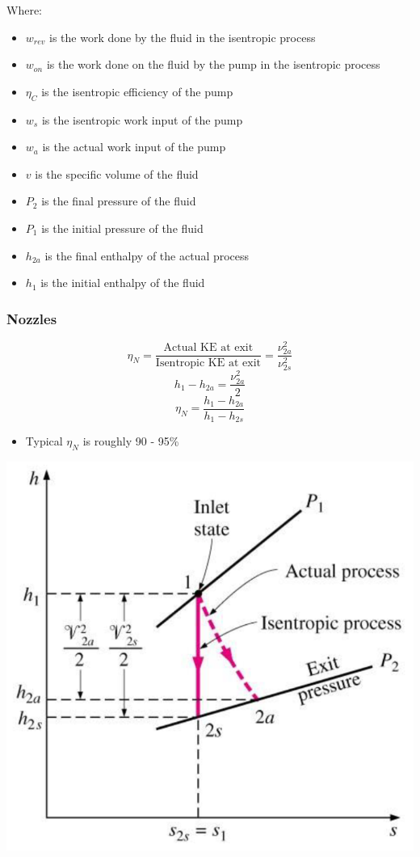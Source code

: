 \documentclass[11pt]{article}
\begin{document}
Where:
\begin{itemize}
\item \(w_{rev}\) is the work done by the fluid in the isentropic process
\item \(w_{on}\) is the work done on the fluid by the pump in the isentropic process
\item \(\eta_C\) is the isentropic efficiency of the pump
\item \(w_s\) is the isentropic work input of the pump
\item \(w_a\) is the actual work input of the pump
\item \(v\) is the specific volume of the fluid
\item \(P_2\) is the final pressure of the fluid
\item \(P_1\) is the initial pressure of the fluid
\item \(h_{2a}\) is the final enthalpy of the actual process
\item \(h_1\) is the initial enthalpy of the fluid
\end{itemize}

 \newpage

\subsubsection{Nozzles}
\label{sec:org9147f63}
\[\eta_N = \frac{\text{Actual KE at exit}}{\text{Isentropic KE at exit}} = \frac{\nu_{2a}^2}{\nu_{2s}^2}\]
\[h_1 - h_{2a} = \frac{\nu_{2a}^2}{2}\]
\[\eta_N = \frac{h_1 - h_{2a}}{h_1 - h_{2s}}\]

\begin{itemize}
\item Typical \(\eta_N\) is roughly 90 - 95\%
\end{itemize}

\begin{center}
\includegraphics[scale=0.8]{./images/isentropic-efficiency-of-nozzles.png}
\end{center}
\end{document}
